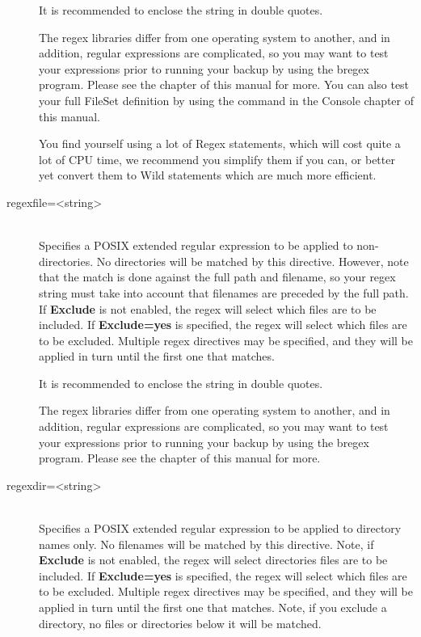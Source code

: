 \begin{description}
   It is recommended to enclose the string in double quotes.

   The regex libraries differ from one operating system to
   another, and in addition, regular expressions are complicated,
   so you may want to test your expressions prior to running your
   backup by using the bregex program. Please see the
    chapter of this manual for
   more. You can also test your full FileSet definition by using
   the  command in the Console
   chapter of this manual.

   You find yourself using a lot of Regex statements, which will cost quite a lot
   of CPU time, we recommend you simplify them if you can, or better yet
   convert them to Wild statements which are much more efficient.


\item [regexfile={\textless}string{\textgreater}] \hfill \\
   Specifies a POSIX extended regular expression to be applied to
   non-directories. No directories will be matched by this directive.
   However, note that the match is done against the full path and
   filename, so your regex string must take into account that filenames
   are preceded by the full path.
   If {\bf Exclude} is not enabled, the regex will select which files are
   to be included.  If {\bf Exclude=yes} is specified, the regex will
   select which files are to be excluded.  Multiple regex directives may be
   specified, and they will be applied in turn until the first one that
   matches.

   It is recommended to enclose the string in double quotes.

   The regex libraries differ from one operating system to
   another, and in addition, regular expressions are complicated,
   so you may want to test your expressions prior to running your
   backup by using the bregex program. Please see the
    chapter of this manual for
   more.


\item [regexdir={\textless}string{\textgreater}] \hfill \\
   Specifies a POSIX extended regular expression to be applied to directory
   names only.  No filenames will be matched by this directive.  Note, if
   {\bf Exclude} is not enabled, the regex will select directories
   files are to be included.  If {\bf Exclude=yes} is specified, the
   regex will select which files are to be excluded.  Multiple
   regex directives may be specified, and they will be applied in turn
   until the first one that matches.  Note, if you exclude a directory, no
   files or directories below it will be matched.


\end{description}
